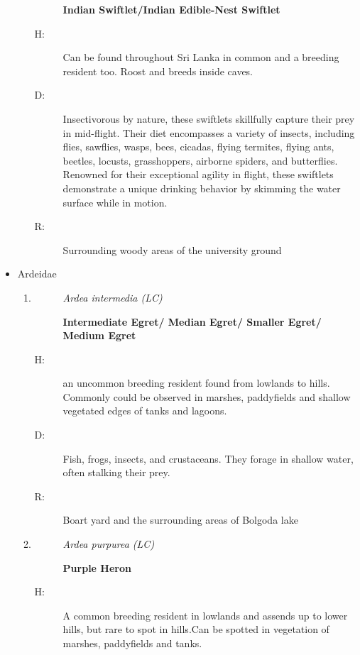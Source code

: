 \begin{itemize}
\begin{enumerate}
\begin{description}
\item[]%
\textbf{Indian Swiftlet/Indian Edible{-}Nest Swiftlet}%
\end{description}%
\begin{description}%
\item[H: ]%
Can be found throughout Sri Lanka in common and a breeding resident too. Roost and breeds inside caves.%
\item[D: ]%
Insectivorous by nature, these swiftlets skillfully capture their prey in mid{-}flight. Their diet encompasses a variety of insects, including flies, sawflies, wasps, bees, cicadas, flying termites, flying ants, beetles, locusts, grasshoppers, airborne spiders, and butterflies. Renowned for their exceptional agility in flight, these swiftlets demonstrate a unique drinking behavior by skimming the water surface while in motion.%
\item[R: ]%
Surrounding woody areas of the university ground%
\end{description}%
\end{enumerate}%
\item%
Ardeidae%
\begin{enumerate}%
\item%
\begin{description}%
\item[]%
\textit{Ardea intermedia (LC)}%
\item[]%
\textbf{Intermediate Egret/ Median Egret/ Smaller Egret/ Medium Egret}%
\end{description}%
\begin{description}%
\item[H: ]%
an uncommon breeding resident found from lowlands to hills. Commonly could be observed in marshes, paddyfields and shallow vegetated edges of tanks and lagoons.%
\item[D: ]%
Fish, frogs, insects, and crustaceans. They forage in shallow water, often stalking their prey.%
\item[R: ]%
Boart yard and the surrounding areas of Bolgoda lake%
\end{description}%
\item%
\begin{description}%
\item[]%
\textit{Ardea purpurea (LC)}%
\item[]%
\textbf{Purple Heron}%
\end{description}%
\begin{description}%
\item[H: ]%
A common breeding resident in lowlands and assends up to lower hills, but rare to spot in hills.Can be spotted in vegetation of marshes, paddyfields and tanks. %

\end{description}
\end{enumerate}
\end{itemize}
